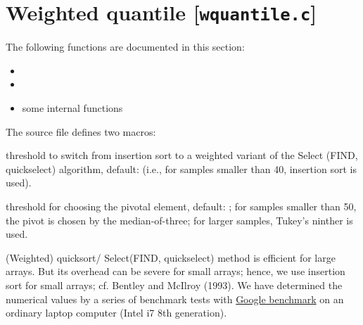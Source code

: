 \documentclass[a4paper,oneside,10pt,DIV=12]{scrartcl}
\begin{document}
\clearpage
\section{Weighted quantile [\texttt{wquantile.c}]}
\label{ch:wquantile}
The following functions are documented in this section:
\begin{itemize}
	\item {}
	\item {}
	\item some internal functions
\end{itemize}

\noindent The source file  defines two macros:
\begin{ldescription}
	\item[\code{\_n\_quickselect}] threshold to switch from insertion sort to
		a weighted variant of the Select (FIND, quickselect) algorithm,
		default:  (i.e., for samples smaller than 40, insertion sort
		is used).
	\item[\code{\_n\_ninther}] threshold for choosing the pivotal element,
		default: ; for samples smaller than 50, the pivot is chosen
		by the median-of-three; for larger samples, Tukey's ninther is used.
\end{ldescription}
\noindent (Weighted) quicksort/ Select(FIND, quickselect) method is efficient
for large arrays. But its overhead can be severe for small arrays; hence,
we use insertion sort for small arrays; cf. Bentley and McIlroy (1993). We
have determined the numerical values by a series of benchmark tests with
\href{https://github.com/google/benchmark}{Google benchmark} on an ordinary
laptop computer (Intel i7 8th generation).
\end{document}

